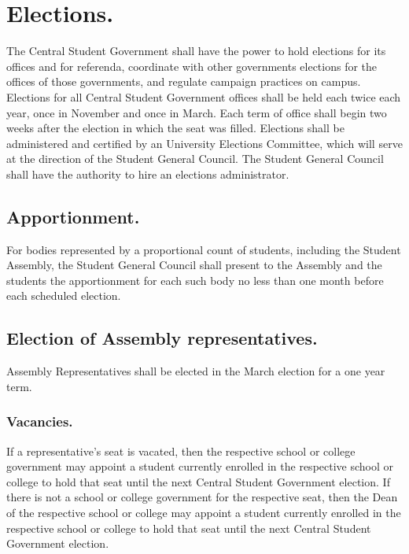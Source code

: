 \section{Elections.}
    The Central Student Government shall have the power to hold elections for its offices and for referenda, coordinate with other governments elections for the offices of those governments, and regulate campaign practices on campus. Elections for all Central Student Government offices shall be held each twice each year, once in November and once in March. Each term of office shall begin two weeks after the election in which the seat was filled. Elections shall be administered and certified by an University Elections Committee, which will serve at the direction of the Student General Council. The Student General Council shall have the authority to hire an elections administrator.

\subsection{Apportionment.}
For bodies represented by a proportional count of students, including the Student Assembly, the Student General Council shall present to the Assembly and the students the apportionment for each such body no less than one month before each scheduled election.

\subsection{Election of Assembly representatives.}  Assembly Representatives shall be elected in the March election for a one year term.

\subsubsection{Vacancies.}  If a representative's seat is vacated, then the respective school or college government may appoint a student currently enrolled in the respective school or college to hold that seat until the next Central Student Government election.  If there is not a school or college government for the respective seat, then the Dean of the respective school or college may appoint a student currently enrolled in the respective school or college to hold that seat until the next Central Student Government election.
